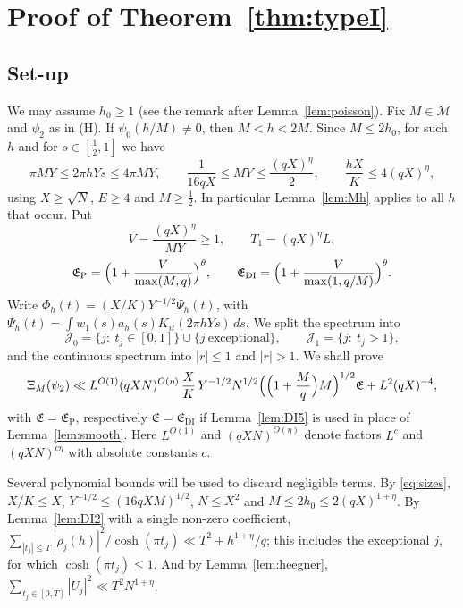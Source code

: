 \documentclass[11pt]{amsart}
\theoremstyle{remark}
\theoremstyle{definition}
\numberwithin{equation}{section}
\newcommand{\Mset}{\mathcal{M}}
\newcommand{\Jc}{\mathcal{J}}
\begin{document}
\section{Proof of Theorem~\ref{thm:typeI}}\label{sec:proof}

\subsection{Set-up}
We may assume $h_0\ge1$ (see the remark after Lemma~\ref{lem:poisson}). Fix $M\in\Mset$ and $\psi_2$ as in (H). If $\psi_0(h/M)\ne0$, then $M<h<2M$. Since $M\le2h_0$, for such $h$ and for $s\in[\frac12,1]$ we have
\begin{equation}\label{eq:sizes}
\pi MY\le2\pi hYs\le4\pi MY,\qquad\frac1{16qX}\le MY\le\frac{(qX)^\eta}{2},\qquad\frac{hX}K\le4(qX)^\eta,
\end{equation}
using $X\ge\sqrt N$, $E\ge4$ and $M\ge\frac12$. In particular Lemma~\ref{lem:Mh} applies to all $h$ that occur. Put
\[
V=\frac{(qX)^\eta}{MY}\ge1,\qquad T_1=(qX)^\eta L,
\]
\[
\mathfrak E_{\mathrm P}=\Bigl(1+\frac{V}{\max(M,q)}\Bigr)^{\theta},\qquad\mathfrak E_{\mathrm{DI}}=\Bigl(1+\frac{V}{\max(1,q/M)}\Bigr)^{\theta}.
\]
Write $\Phi_h(t)=(X/K)Y^{-1/2}\Psi_h(t)$, with $\Psi_h(t)=\int w_1(s)a_h(s)K_{it}(2\pi hYs)\,ds$. We split the spectrum into
\[
\Jc_0=\{j:\ t_j\in[0,1]\}\cup\{j\ \text{exceptional}\},\qquad\Jc_1=\{j:\ t_j>1\},
\]
and the continuous spectrum into $|r|\le1$ and $|r|>1$. We shall prove
\begin{equation}\label{eq:XiMbound}
\Xi_M(\psi_2)\ll L^{O(1)}(qXN)^{O(\eta)}\,\frac XK\,Y^{-1/2}N^{1/2}\Bigl(\Bigl(1+\frac Mq\Bigr)M\Bigr)^{1/2}\mathfrak E+L^{2}(qX)^{-4},
\end{equation}
with $\mathfrak E=\mathfrak E_{\mathrm P}$, respectively $\mathfrak E=\mathfrak E_{\mathrm{DI}}$ if Lemma~\ref{lem:DI5} is used in place of Lemma~\ref{lem:smooth}. Here $L^{O(1)}$ and $(qXN)^{O(\eta)}$ denote factors $L^{c}$ and $(qXN)^{c\eta}$ with absolute constants $c$.

Several polynomial bounds will be used to discard negligible terms. By \eqref{eq:sizes}, $X/K\le X$, $Y^{-1/2}\le(16qXM)^{1/2}$, $N\le X^2$ and $M\le2h_0\le2(qX)^{1+\eta}$. By Lemma~\ref{lem:DI2} with a single non-zero coefficient, $\sum_{|t_j|\le T}|\rho_j(h)|^2/\cosh(\pi t_j)\ll T^2+h^{1+\eta}/q$; this includes the exceptional $j$, for which $\cosh(\pi t_j)\le1$. And by Lemma~\ref{lem:heegner}, $\sum_{t_j\in[0,T]}|U_j|^2\ll T^2N^{1+\eta}$.
\end{document}
